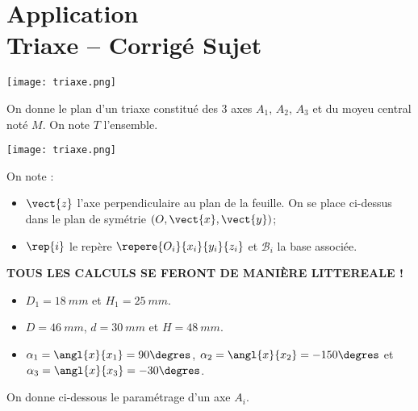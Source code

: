 \chapter*{Application  \\ 
Triaxe -- \ifprof Corrigé \else Sujet \fi}

\iflivret {} \else
\ifprof  {} \else \fi
\fi

\setcounter{question}{0}
\begin{marginfigure}[3cm]
\texttt{[image: triaxe.png]}
\end{marginfigure}



On donne le plan d'un triaxe constitué des 3 axes $A_1$, $A_2$, $A_3$ et du moyeu central noté $M$. On note  $T$ l'ensemble.

\begin{center}
\texttt{[image: triaxe.png]}
\end{center}
On note :
\begin{itemize}
\item $\vect{z}$ l'axe perpendiculaire au plan de la feuille. On se place ci-dessus dans le plan de symétrie $\left(O,\vect{x},\vect{y}\right)$;
\item $\rep{i}$ le repère $\repere{O_i}{x_i}{y_i}{z_i}$ et $\mathcal{B}_i$ la base associée.
\end{itemize}





\textbf{TOUS LES CALCULS SE FERONT DE MANIÈRE LITTEREALE !}
\begin{itemize}
\item $D_1=\SI{18}{mm}$ et $H_1=\SI{25}{mm}$.
\item $D=\SI{46}{mm}$, $d=\SI{30}{mm}$ et $H=\SI{48}{mm}$.
\item $\alpha_1=\angl{x}{x_1}=90\degres$, $\alpha_2=\angl{x}{x_2}=-150\degres$ et 
$\alpha_3=\angl{x}{x_3}=-30\degres$.
\end{itemize}

On donne ci-dessous le paramétrage d'un axe $A_i$.

